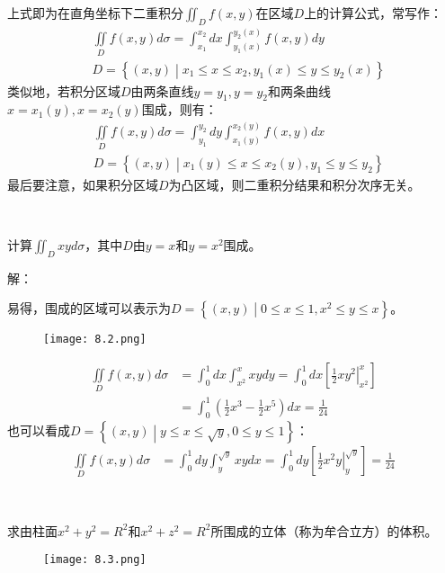 上式即为在直角坐标下二重积分$\iint_D{f\left( x,y \right)}$在区域$D$上的计算公式，常写作：
\begin{align*}
&\iint\limits_D{f\left( x,y \right) d\sigma}=\int_{x_1}^{x_2}{dx\int_{y_1\left( x \right)}^{y_2\left( x \right)}{f\left( x,y \right) dy}} \\
&D=\left\{ \left( x,y \right) \middle| x_1\leqslant x\leqslant x_2,y_1\left( x \right) \leqslant y\leqslant y_2\left( x \right) \right\}
\end{align*}
类似地，若积分区域$D$由两条直线$y=y_1,y=y_2$和两条曲线$x=x_1\left( y \right) ,x=x_2\left( y \right) $围成，则有：
\begin{align*}
&\iint\limits_D{f\left( x,y \right) d\sigma}=\int_{y_1}^{y_2}{dy\int_{x_1\left( y \right)}^{x_2\left( y \right)}{f\left( x,y \right) dx}} \\
&D=\left\{ \left( x,y \right) \middle| x_1\left( y \right) \leqslant x\leqslant x_2\left( y \right) ,y_1\leqslant y\leqslant y_2 \right\}
\end{align*}
最后要注意，如果积分区域$D$为凸区域，则二重积分结果和积分次序无关。

~

\begin{example}
计算$\iint_D{xyd\sigma}$，其中$D$由$y=x$和$y=x^2$围成。
\end{example}

解：

易得，围成的区域可以表示为$D=\left\{ \left( x,y \right) \middle| 0\leqslant x\leqslant 1,x^2\leqslant y\leqslant x \right\} $。
\begin{figure}[h]
\centering
\texttt{[image: 8.2.png]}
\end{figure}
\begin{align*}
\iint\limits_D{f\left( x,y \right) d\sigma}&=\int_0^1{dx\int_{x^2}^x{xydy}}=\int_0^1{dx\left[ \left. \frac{1}{2}xy^2 \right|_{x^2}^{x} \right]} \\
&=\int_0^1{\left( \frac{1}{2}x^3-\frac{1}{2}x^5 \right) dx}=\frac{1}{24}
\end{align*}
也可以看成$D=\left\{ \left( x,y \right) \middle| y\leqslant x\leqslant \sqrt{y},0\leqslant y\leqslant 1 \right\} $：
\begin{align*}
\iint\limits_D{f\left( x,y \right) d\sigma}&=\int_0^1{dy\int_y^{\sqrt{y}}{xydx}}=\int_0^1{dy\left[ \left. \frac{1}{2}x^2y \right|_{y}^{\sqrt{y}} \right]} =\frac{1}{24}
\end{align*}

~

\begin{example}
求由柱面$x^2+y^2=R^2$和$x^2+z^2=R^2$所围成的立体（称为牟合立方）的体积。
\begin{figure}[ht]
\centering
\texttt{[image: 8.3.png]}
\end{figure}
\end{example}

